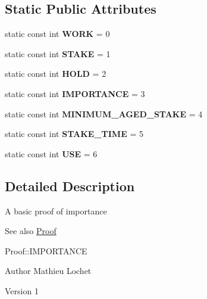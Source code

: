 \subsection*{Static Public Attributes}
\begin{DoxyCompactItemize}
\item 
\mbox{\label{classProof_a457d231986439ee6bcc945daacfc28fc}} 
static const int {\bfseries W\+O\+RK} = 0
\item 
\mbox{\label{classProof_acf157976c3c86ef2fd0e838b8c4ac992}} 
static const int {\bfseries S\+T\+A\+KE} = 1
\item 
\mbox{\label{classProof_ae5c2a86640bf558ff5625157e23b3eec}} 
static const int {\bfseries H\+O\+LD} = 2
\item 
\mbox{\label{classProof_a4e71a5e5928900794353acdd169ca652}} 
static const int {\bfseries I\+M\+P\+O\+R\+T\+A\+N\+CE} = 3
\item 
\mbox{\label{classProof_a1a08ffc465f4fcfde396d4c4feb22eb0}} 
static const int {\bfseries M\+I\+N\+I\+M\+U\+M\+\_\+\+A\+G\+E\+D\+\_\+\+S\+T\+A\+KE} = 4
\item 
\mbox{\label{classProof_a1aa2cb91c5be4ca021714ff6fc01da4a}} 
static const int {\bfseries S\+T\+A\+K\+E\+\_\+\+T\+I\+ME} = 5
\item 
\mbox{\label{classProof_a3f6898fa1d652d32182c3c387c8e979c}} 
static const int {\bfseries U\+SE} = 6
\end{DoxyCompactItemize}


\subsection{Detailed Description}
A basic proof of importance \begin{DoxySeeAlso}{See also}
\mbox{\hyperlink{classProof}{Proof}} 

Proof\+::\+I\+M\+P\+O\+R\+T\+A\+N\+CE
\end{DoxySeeAlso}
\begin{DoxyAuthor}{Author}
Mathieu Lochet 
\end{DoxyAuthor}
\begin{DoxyVersion}{Version}
1 
\end{DoxyVersion}


